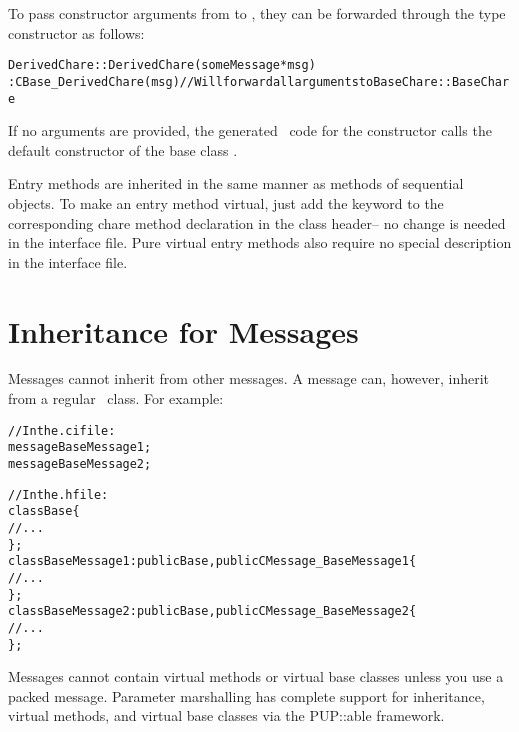 To pass constructor arguments
from 
to , they can be forwarded
through the  type constructor as follows:

\begin{alltt}
DerivedChare::DerivedChare(someMessage *msg)
: CBase_DerivedChare(msg) // Will forward all arguments to BaseChare::BaseChare
{ }
\end{alltt}

If no arguments are provided, the generated \CC\ code for
the  constructor calls the default
constructor  of the base
class .


Entry methods are inherited in the same manner as methods of
sequential \CC{} objects.  To make an entry method virtual, just add
the keyword  to the corresponding chare method declaration
in the class header-- no change is needed in the interface file.  Pure
virtual entry methods also require no special description in the
interface file.


\section{Inheritance for Messages}


Messages cannot inherit from other messages.  A message can, however,
inherit from a regular \CC\ class.  For example:

\begin{alltt}
//In the .ci file:
  message BaseMessage1;
  message BaseMessage2;

//In the .h file:
  class Base \{
    // ...
  \};
  class BaseMessage1 : public Base, public CMessage_BaseMessage1 \{
    // ...
  \};
  class BaseMessage2 : public Base, public CMessage_BaseMessage2 \{
    // ...
  \};
\end{alltt}

Messages cannot contain virtual methods
or virtual base classes unless you use a packed message.
Parameter marshalling has complete support for inheritance, virtual
methods, and virtual base classes via the PUP::able framework.


